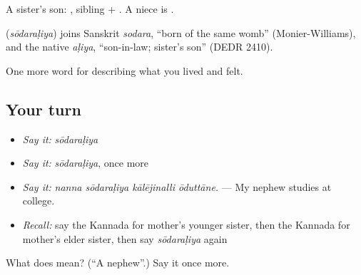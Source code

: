 A sister's son: , sibling + . A niece is  .

\begin{cousinweb}
\textbf{} (\emph{sōdaraḷiya}) joins Sanskrit \emph{sodara}, \textquotedblleft{}born of the same womb\textquotedblright{} (Monier-Williams), and the native \emph{aḷiya}, \textquotedblleft{}son-in-law; sister's son\textquotedblright{} (DEDR 2410).
\end{cousinweb}

\begin{grammarlens}[title={What you've built}]
One more word for describing what you lived and felt.
\end{grammarlens}

\subsection*{Your turn}
\begin{itemize}
\raggedright
  \item \emph{Say it:} \emph{sōdaraḷiya}
  \item \emph{Say it:} \emph{sōdaraḷiya}, once more
  \item \emph{Say it:} \emph{nanna sōdaraḷiya kālējinalli ōduttāne.} — My nephew studies at college.
  \item \emph{Recall:} say the Kannada for mother's younger sister, then the Kannada for mother's elder sister, then say \emph{sōdaraḷiya} again
\end{itemize}

\begin{tcolorbox}[breakable,colback=teal!4,colframe=teal!35!black,title={Before you move on}]
What does  mean? (\textquotedblleft{}A nephew\textquotedblright{}.) Say it once more.
\end{tcolorbox}
